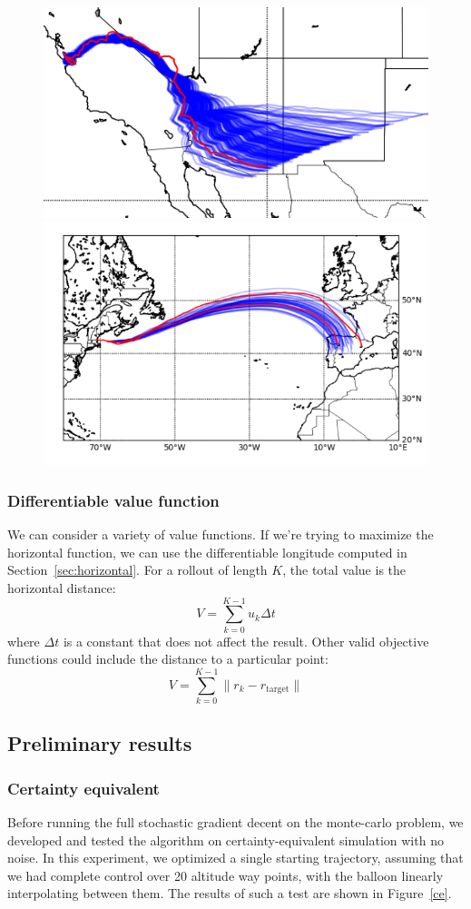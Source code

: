 \documentclass[11pt]{scrartcl} %
\begin{document}
\begin{figure}[h]
\includegraphics[width=0.5\linewidth]{winds.png}
\includegraphics[width=0.5\linewidth]{spain.png}
\label{winds}
\end{figure}

\subsubsection{Differentiable value function}
We can consider a variety of value functions. If we're trying to maximize the horizontal function, we can use the differentiable longitude computed in Section~\ref{sec:horizontal}. For a rollout of length $K$, the total value is the horizontal distance:
\begin{equation}
V = \sum_{k=0}^{K-1} u_k \Delta t\label{eqn:value}
\end{equation}
where $\Delta t$ is a constant that does not affect the result. Other valid objective functions could include the distance to a particular point:
\[V = \sum_{k=0}^{K-1} \lVert r_k - r_\text{target}\rVert\]

\newpage
\subsection{Preliminary results}
\subsubsection*{Certainty equivalent}
Before running the full stochastic gradient decent on the monte-carlo problem, we developed and tested the algorithm on certainty-equivalent simulation with no noise. In this experiment, we optimized a single starting trajectory, assuming that we had complete control over 20 altitude way points, with the balloon linearly interpolating between them. The results of such a test are shown in Figure~\ref{ce}. 
\end{document}
